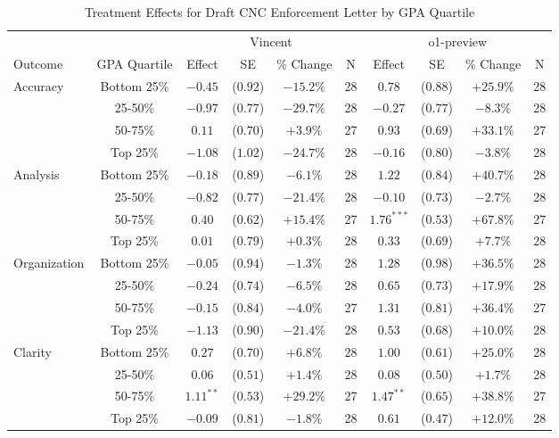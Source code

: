 \begin{table}[!htbp]
\centering
\caption{Treatment Effects for Draft CNC Enforcement Letter by GPA Quartile}
\label{tab:task6_gpa}
\begin{tabular}{lccccccccc}
\hline\hline
& & \multicolumn{4}{c}{Vincent} & \multicolumn{4}{c}{o1-preview} \\
\cline{3-10}
Outcome & GPA Quartile & Effect & SE & \% Change & N & Effect & SE & \% Change & N \\
\hline
\multirow{4}{*}{Accuracy} & Bottom 25\% & $-0.45$ & ($0.92$) & $-15.2\%$ & 28 & $0.78$ & ($0.88$) & $+25.9\%$ & 28 \\
& 25-50\% & $-0.97$ & ($0.77$) & $-29.7\%$ & 28 & $-0.27$ & ($0.77$) & $-8.3\%$ & 28 \\
& 50-75\% & $0.11$ & ($0.70$) & $+3.9\%$ & 27 & $0.93$ & ($0.69$) & $+33.1\%$ & 27 \\
& Top 25\% & $-1.08$ & ($1.02$) & $-24.7\%$ & 28 & $-0.16$ & ($0.80$) & $-3.8\%$ & 28 \\
\hline
\multirow{4}{*}{Analysis} & Bottom 25\% & $-0.18$ & ($0.89$) & $-6.1\%$ & 28 & $1.22$ & ($0.84$) & $+40.7\%$ & 28 \\
& 25-50\% & $-0.82$ & ($0.77$) & $-21.4\%$ & 28 & $-0.10$ & ($0.73$) & $-2.7\%$ & 28 \\
& 50-75\% & $0.40$ & ($0.62$) & $+15.4\%$ & 27 & $1.76^{***}$ & ($0.53$) & $+67.8\%$ & 27 \\
& Top 25\% & $0.01$ & ($0.79$) & $+0.3\%$ & 28 & $0.33$ & ($0.69$) & $+7.7\%$ & 28 \\
\hline
\multirow{4}{*}{Organization} & Bottom 25\% & $-0.05$ & ($0.94$) & $-1.3\%$ & 28 & $1.28$ & ($0.98$) & $+36.5\%$ & 28 \\
& 25-50\% & $-0.24$ & ($0.74$) & $-6.5\%$ & 28 & $0.65$ & ($0.73$) & $+17.9\%$ & 28 \\
& 50-75\% & $-0.15$ & ($0.84$) & $-4.0\%$ & 27 & $1.31$ & ($0.81$) & $+36.4\%$ & 27 \\
& Top 25\% & $-1.13$ & ($0.90$) & $-21.4\%$ & 28 & $0.53$ & ($0.68$) & $+10.0\%$ & 28 \\
\hline
\multirow{4}{*}{Clarity} & Bottom 25\% & $0.27$ & ($0.70$) & $+6.8\%$ & 28 & $1.00$ & ($0.61$) & $+25.0\%$ & 28 \\
& 25-50\% & $0.06$ & ($0.51$) & $+1.4\%$ & 28 & $0.08$ & ($0.50$) & $+1.7\%$ & 28 \\
& 50-75\% & $1.11^{**}$ & ($0.53$) & $+29.2\%$ & 27 & $1.47^{**}$ & ($0.65$) & $+38.8\%$ & 27 \\
& Top 25\% & $-0.09$ & ($0.81$) & $-1.8\%$ & 28 & $0.61$ & ($0.47$) & $+12.0\%$ & 28 \\

\end{tabular}
\end{table}
